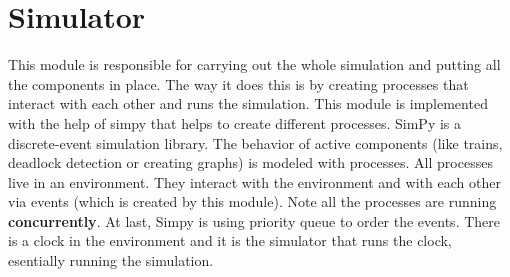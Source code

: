 \section{Simulator}

This module is responsible for carrying out the whole simulation and
 putting all the components in place. The way it does this is by creating
 processes that interact with each other and runs the simulation.
 This module is implemented with the help 
 of simpy that helps to create different processes. SimPy is a discrete-event simulation 
 library. The behavior of active components (like trains, deadlock detection or creating graphs) 
 is modeled with processes. All processes live in an environment. They interact with the environment 
 and with each other via events (which is created by this module). Note all the processes are 
 running \textbf{concurrently}. At last, Simpy is using priority queue to 
 order the events. There is a clock in the environment and it is the simulator that runs the clock, 
 esentially running the simulation. 

\vspace{0.25cm}

